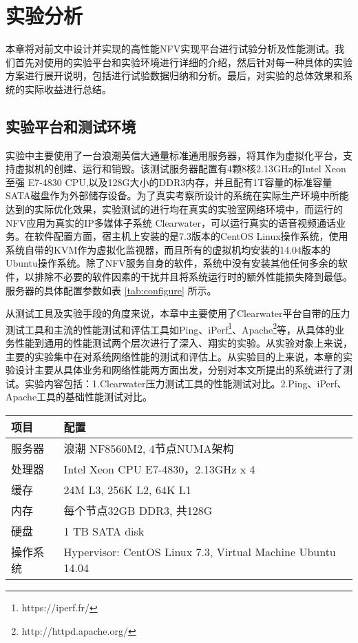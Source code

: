 \chapter{实验分析}
\label{chapter:evaluation}
本章将对前文中设计并实现的高性能NFV实现平台进行试验分析及性能测试。我们首先对使用的实验平台和实验环境进行详细的介绍，然后针对每一种具体的实验方案进行展开说明，包括进行试验数据归纳和分析。最后，对实验的总体效果和系统的实际收益进行总结。

\section{实验平台和测试环境}
实验中主要使用了一台浪潮英信大通量标准通用服务器，将其作为虚拟化平台，支持虚拟机的创建、运行和销毁。该测试服务器配置有4颗8核2.13GHz的Intel Xeon至强 E7-4830 CPU,以及128G大小的DDR3内存，并且配有1T容量的标准容量SATA磁盘作为外部储存设备。为了真实考察所设计的系统在实际生产环境中所能达到的实际优化效果，实验测试的进行均在真实的实验室网络环境中，而运行的NFV应用为真实的IP多媒体子系统 Clearwater，可以运行真实的语音视频通话业务。在软件配置方面，宿主机上安装的是7.3版本的CentOS Linux操作系统，使用系统自带的KVM作为虚拟化监视器，而且所有的虚拟机均安装的14.04版本的Ubuntu操作系统。除了NFV服务自身的软件，系统中没有安装其他任何多余的软件，以排除不必要的软件因素的干扰并且将系统运行时的额外性能损失降到最低。服务器的具体配置参数如表 \ref{tab:configure} 所示。

从测试工具及实验手段的角度来说，本章中主要使用了Clearwater平台自带的压力测试工具和主流的性能测试和评估工具如Ping、iPerf\footnote{https://iperf.fr/}、Apache\footnote{http://httpd.apache.org/}等，从具体的业务性能到通用的性能测试两个层次进行了深入、翔实的实验。从实验对象上来说，主要的实验集中在对系统网络性能的测试和评估上。从实验目的上来说，本章的实验设计主要从具体业务和网络性能两方面出发，分别对本文所提出的系统进行了测试。实验内容包括：1.Clearwater压力测试工具的性能测试对比。2.Ping、iPerf、Apache工具的基础性能测试对比。

\begin{table}[htb]
	\centering
	\begin{tabular}{ | l | p{6cm} |}\hline
		\textbf{项目} &							 \textbf{配置}  				\\ 	\hline
		服务器        &					 浪潮 NF8560M2, 4节点NUMA架构\\ \hline
		处理器 	   &  Intel Xeon CPU E7-4830，2.13GHz x 4  \\ \hline
		缓存    & 24M L3, 256K L2,  64K L1 \\ \hline
		内存 			&  每个节点32GB DDR3,  共128G   \\   \hline
		硬盘     & 				1 TB SATA disk \\ \hline
		操作系统    & Hypervisor: CentOS Linux 7.3,  Virtual Machine Ubuntu 14.04 \\ \hline
	\end{tabular}
\end{table}

